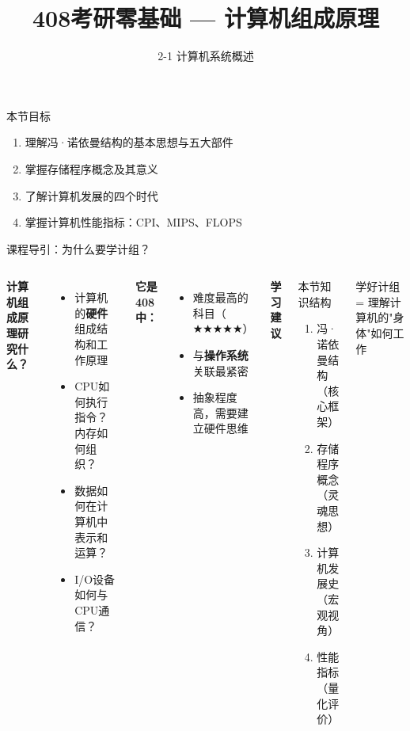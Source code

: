 \documentclass[10pt, aspectratio=169]{beamer}
\title{408考研零基础 --- 计算机组成原理}
\subtitle{2-1 计算机系统概述}
\author{}
\date{}
\begin{document}
\begin{frame}{本节目标}
    \begin{enumerate}
        \item 理解冯·诺依曼结构的基本思想与五大部件
        \item 掌握存储程序概念及其意义
        \item 了解计算机发展的四个时代
        \item 掌握计算机性能指标：CPI、MIPS、FLOPS
    \end{enumerate}
\end{frame}

\begin{frame}{课程导引：为什么要学计组？}
    \begin{columns}[T]
        \textbf{计算机组成原理研究什么？}
        \begin{itemize}
            \item 计算机的\textbf{硬件}组成结构和工作原理
            \item CPU如何执行指令？内存如何组织？
            \item 数据如何在计算机中表示和运算？
            \item I/O设备如何与CPU通信？
        \end{itemize}
        \vspace{0.5em}
        \textbf{它是408中：}
        \begin{itemize}
            \item \alert{难度最高}的科目（$\bigstar\bigstar\bigstar\bigstar\bigstar$）
            \item 与\textbf{操作系统}关联最紧密
            \item 抽象程度高，需要建立硬件思维
        \end{itemize}
        \textbf{学习建议}
        \begin{block}{本节知识结构}
            \begin{enumerate}
                \item 冯·诺依曼结构（核心框架）
                \item 存储程序概念（灵魂思想）
                \item 计算机发展史（宏观视角）
                \item 性能指标（量化评价）
            \end{enumerate}
        \end{block}
        \vspace{0.3em}
        \textcolor{408blue}{学好计组 = 理解计算机的"身体"如何工作}
    \end{columns}
\end{frame}
\end{document}
